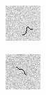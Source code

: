 \begin{figure}[!h]
\centering
    \begin{subfigure}[t]{.23\textwidth}
        \centering
        \includegraphics[width=\textwidth]{images/wormA.png}
    \end{subfigure}
    \begin{subfigure}[t]{.23\textwidth}
        \centering
        \includegraphics[width=\textwidth]{images/wormB.png}

\end{subfigure}
\end{figure}
